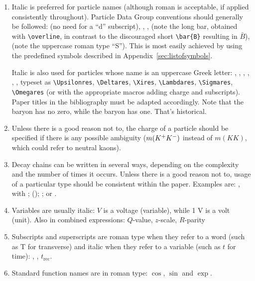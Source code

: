 \begin{enumerate}
\item Italic is preferred for particle names (although roman is
  acceptable, if applied consistently throughout).  Particle Data
  Group conventions should generally be followed: \Bd (no need for a
  ``d'' subscript), \decay{\Bs}{\jpsi\phi}, \Bsb,
  (note the long bar, obtained with \verb!\overline!, in contrast to the discouraged short \verb!\bar{B}! resulting in $\bar{B}$), \KS (note the
  uppercase roman type ``S''). 
  This is most easily achieved by using the predefined symbols described in 
  Appendix~\ref{sec:listofsymbols}.

  Italic is also used for particles whose name is an uppercase Greek letter:
  \Upsilonres, \Deltares, \Xires, \Lambdares, \Sigmares, \Omegares, typeset as
  \verb!\Upsilonres!, \verb!\Deltares!, \verb!\Xires!, \verb!\Lambdares!, \verb!\Sigmares!, \verb!\Omegares! (or with the appropriate macros adding charge and subscripts). Paper titles in the bibliography must be adapted accordingly.
  Note that the \Lz baryon has no zero, while the \Lb baryon has one. That's historical.
  
\item Unless there is a good reason not to, the charge of a particle should be
  specified if there is any possible ambiguity 
  ($m({{K}^+}{{K}^-})$ instead of $m(KK)$, which could refer to neutral kaons).


\item Decay chains can be written in several ways, depending on the complexity and the number of times it occurs. Unless there is a good reason not to, usage of a particular type should be consistent within the paper.
Examples are: 
\decay{\Dsp}{\phi\pip}, with \decay{\phi}{\Kp\Km}; 
\decay{\Dsp}{\phi\pip} (\decay{\phi}{\Kp\Km});  
\decay{\Dsp}{\phi(}{\Kp\Km)\pip}; or
\decay{\Dsp}{[\Kp\Km]_\phi\pip}.

\item Variables are usually italic: $V$ is a voltage (variable), while
  1 V is a volt (unit). Also in combined expressions: $Q$-value, $z$-scale, $R$-parity \etc

\item Subscripts and superscripts are roman type when they refer to a word (such as T
  for transverse) and italic when they refer to a variable (such as
  $t$ for time): \pt, \dms, $t_{\mathrm{rec}}$.


\item Standard function names are in roman type: \eg $\cos$, $\sin$
  and $\exp$.


\end{enumerate}
